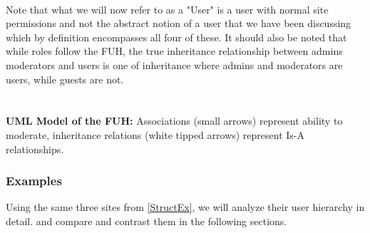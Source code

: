 \documentclass[]{article}
\begin{document}
\paragraph{}
Note that what we will now refer to as a "User" is a user with normal site permissions and not the abstract notion of a user that we have been discussing which by definition encompasses all four of these. It should also be noted that while roles follow the FUH, the true inheritance relationship between admins moderators and users is one of inheritance where admins and moderators are users, while guests are not.
\\\\\\
\textbf{UML Model of the FUH:} Associations (small arrows) represent ability to moderate, inheritance relations (white tipped arrows) represent Is-A relationships.
\vspace{0.5 cm}
\begin{center}
\end{center}

\newpage
\subsubsection{Examples}
Using the same three sites from \ref{StructEx}, we will analyze their user hierarchy in detail. and compare and contrast them in the following sections.
\end{document}
